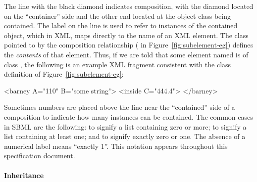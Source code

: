 The line with the black diamond indicates composition,
with the diamond located on the ``container'' side and the other
end located at the object class being contained.  The label on the
line is used to refer to instances of the contained
object, which in XML, maps directly to the name of an XML element.
The class pointed to by the composition relationship (
in Figure~\ref{fig:subelement-eg}) defines the \emph{contents} of
that element.  Thus, if we are told that some element named
 is of class , the following is an
example XML fragment consistent with the class definition of
Figure~\ref{fig:subelement-eg}:

\begin{example}
<barney A="110" B="some string">
    <inside C="444.4">
</barney>
\end{example}

Sometimes numbers are placed above the line near the ``contained''
side of a composition to indicate how many instances can be
contained.  The common cases in SBML are the following:
\token{[0..*]} to signify a list containing zero or more;
\token{[1..*]} to signify a list containing at least one; and
\token{[0..1]} to signify exactly zero or one.  The absence of a
numerical label means ``exactly 1''.  This notation appears
throughout this specification document.


\clearpage

\paragraph{Inheritance}

